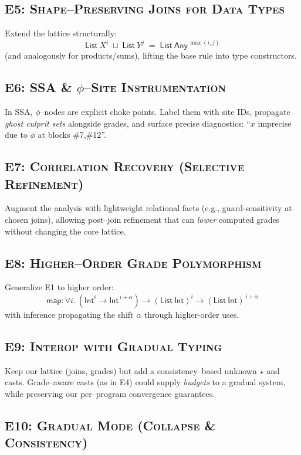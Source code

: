 \subsection{\textsc{E5: Shape–Preserving Joins for Data Types}}
Extend the lattice structurally:
\[
\textsf{List}\ X^{i} \;\sqcup\; \textsf{List}\ Y^{j}
\;=\; \textsf{List}\ \textsf{Any}^{\,\max(i,j)}
\]
(and analogously for products/sums), lifting the base rule into type constructors.

\subsection{\textsc{E6: SSA \& \texorpdfstring{$\phi$}{phi}–Site Instrumentation}}
In SSA, $\phi$–nodes are explicit choke points.
Label them with site IDs, propagate \emph{ghost culprit sets} alongside grades, and surface precise diagnostics:
``$x$ imprecise due to $\phi$ at blocks \#7,\#12''.

\subsection{\textsc{E7: Correlation Recovery (Selective Refinement)}}
Augment the analysis with lightweight relational facts (e.g., guard-sensitivity at chosen joins),
allowing post–join refinement that can \emph{lower} computed grades without changing the core lattice.

\subsection{\textsc{E8: Higher–Order Grade Polymorphism}}
Generalize \textsc{E1} to higher order:
\[
\textsf{map} : \forall i.\ (\textsf{Int}^{i}\!\to\!\textsf{Int}^{\,i+\alpha}) \to
(\textsf{List}\ \textsf{Int})^{i} \to (\textsf{List}\ \textsf{Int})^{\,i+\alpha}
\]
with inference propagating the shift $\alpha$ through higher-order uses.

\subsection{\textsc{E9: Interop with Gradual Typing}}
Keep our lattice (joins, grades) but add a consistency–based unknown $\star$ and casts.
Grade–aware casts (as in \textsc{E4}) could supply \emph{budgets} to a gradual system, while preserving our per–program convergence guarantees.

\subsection{\textsc{E10: Gradual Mode (Collapse \& Consistency)}}

